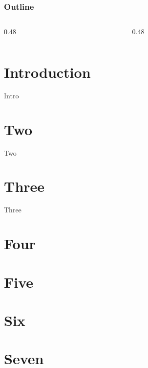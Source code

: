 \documentclass{beamer}
\begin{document}
\begin{frame}
    \frametitle{Outline}
    \begin{columns}[t]
        \begin{column}{0.48\textwidth}
            \tableofcontents[sections={1-7}]
        \end{column}
        \begin{column}{0.48\textwidth}
            \tableofcontents[sections={8-14}]
        \end{column}
    \end{columns}
\end{frame}

\section{Introduction}
\begin{frame}{Intro}\end{frame}
\section{Two}
\begin{frame}{Two}\end{frame}
\section{Three}
\begin{frame}{Three}\end{frame}
\section{Four}
\begin{frame}\end{frame}
\section{Five}
\begin{frame}\end{frame}
\section{Six}
\begin{frame}\end{frame}
\section{Seven}
\begin{frame}\end{frame}
\end{document}
